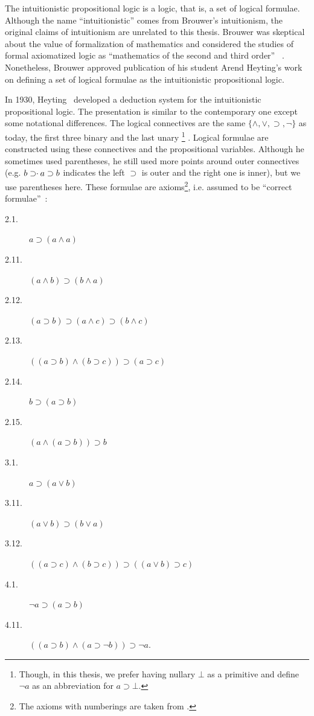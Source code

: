 The intuitionistic propositional logic is a logic, that is, a set of
logical formulae.
Although the name ``intuitionistic'' comes from Brouwer's
intuitionism,
the original claims of intuitionism are unrelated to this thesis.
Brouwer was skeptical about the value of formalization of
mathematics and considered the studies of formal axiomatized logic as
``mathematics of the second and third order''%
~\citep[p.~10]{stigt1998}.
Nonetheless, Brouwer approved publication of his student Arend Heyting's
work on defining a set of logical formulae as the intuitionistic
propositional logic.

In 1930, Heyting~\cite{heyting1930} developed a deduction
system for the
intuitionistic propositional logic.  The presentation is similar to
the contemporary one except some notational differences.  The
logical connectives are the same $\{\wedge,\vee,\supset,\neg\}$ as today, the
first three binary and the last unary%
\footnote{Though, in this thesis, we prefer having nullary $\bot$ as a
primitive and define $\neg a$ as an abbreviation for $a\supset\bot$.}%
.  Logical formulae are constructed
using these connectives and the propositional variables.
Although he sometimes used parentheses, he still used more points
around outer connectives (e.g. $b\supset \kern -3pt\cdot \kern 2pt  a
\supset b$ indicates the left $\supset$ is outer and the right one is
inner), but we use parentheses here.
These formulae are axioms\footnote{The axioms with numberings are taken
from \citet{heyting1930}.}, i.e. assumed to be
``correct formulae''~\cite{heyting1930}:
\begin{description}
 \item[2.1.] $a\supset (a\land a)$
 \item[2.11.] $(a\land b)\supset (b\land a)$
 \item[2.12.] $(a\supset b)\supset (a\land c)\supset (b\land c)$
 \item[2.13.] $((a\supset b)\land (b\supset c))\supset (a\supset c)$
 \item[2.14.] $b\supset (a\supset b)$
 \item[2.15.] $(a\land (a\supset b))\supset b$
 \item[3.1.] $a\supset (a\lor b)$
 \item[3.11.] $(a\lor b)\supset (b\lor a)$
 \item[3.12.] $((a\supset c)\land(b\supset c))\supset ((a\lor b)\supset
      c)$
 \item[4.1.] $\neg a\supset (a\supset b)$
 \item[4.11.] $((a\supset b)\land (a\supset \neg b)) \supset \neg a$\enspace.
\end{description}
